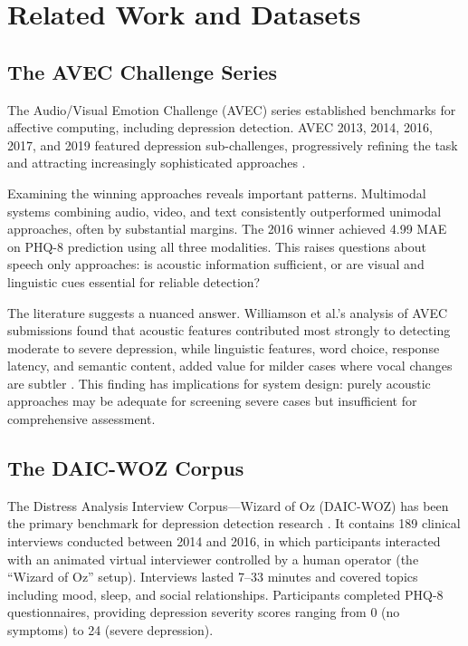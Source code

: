 \section{Related Work and Datasets}

\subsection{The AVEC Challenge Series}

The Audio/Visual Emotion Challenge (AVEC) series established benchmarks for affective computing, including depression detection. AVEC 2013, 2014, 2016, 2017, and 2019 featured depression sub-challenges, progressively refining the task and attracting increasingly sophisticated approaches \cite{valstar2013avec, ringeval2017avec}.

Examining the winning approaches reveals important patterns. Multimodal systems combining audio, video, and text consistently outperformed unimodal approaches, often by substantial margins. The 2016 winner achieved 4.99 MAE on PHQ-8 prediction using all three modalities. This raises questions about speech only approaches: is acoustic information sufficient, or are visual and linguistic cues essential for reliable detection?

The literature suggests a nuanced answer. Williamson et al.'s analysis of AVEC submissions found that acoustic features contributed most strongly to detecting moderate to severe depression, while linguistic features, word choice, response latency, and semantic content, added value for milder cases where vocal changes are subtler \cite{williamson2016detecting}. This finding has implications for system design: purely acoustic approaches may be adequate for screening severe cases but insufficient for comprehensive assessment.

\subsection{The DAIC-WOZ Corpus}

The Distress Analysis Interview Corpus---Wizard of Oz (DAIC-WOZ) has been the primary benchmark for depression detection research \cite{Gratch2014}. It contains 189 clinical interviews conducted between 2014 and 2016, in which participants interacted with an animated virtual interviewer controlled by a human operator (the ``Wizard of Oz'' setup). Interviews lasted 7--33 minutes and covered topics including mood, sleep, and social relationships. Participants completed PHQ-8 questionnaires, providing depression severity scores ranging from 0 (no symptoms) to 24 (severe depression).

